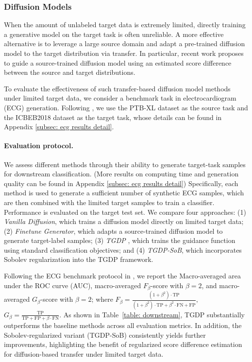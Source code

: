 \documentclass[11pt]{article}
\theoremstyle{plain}
\theoremstyle{definition}
\theoremstyle{remark}
\begin{document}
\subsubsection{ Diffusion Models}\label{subsec:diffusion}


When the amount of unlabeled target data is extremely limited, directly training a generative model on the target task is often unreliable.
A more effective alternative is to leverage a large source domain and adapt a pre-trained diffusion model to the target distribution via transfer.
In particular, recent work \cite{ouyang2024transfer} proposes to guide a source-trained diffusion model using an estimated score difference between the source and target distributions.


To evaluate the effectiveness of such transfer-based diffusion model methods under limited target data, we consider a benchmark task in electrocardiogram (ECG) generation. Following \cite{ouyang2024transfer}, we use the PTB-XL dataset \cite{wagner2020ptb} as the source task and the ICBEB2018 dataset \cite{liu2018open} as the target task, whose details can be found in Appendix \ref{subsec: ecg results detail}.

\paragraph{Evaluation protocol.} We assess different methods through their ability to generate target-task samples for downstream classification. (More results on computing time and generation quality can be found in Appendix \ref{subsec: ecg results detail}) Specifically, each method is used to generate a sufficient number of synthetic ECG samples, which are then combined with the limited target samples to train a classifier. Performance is evaluated on the target test set. We compare four approaches:
(1) \emph{Vanilla Diffusion}, which trains a diffusion model directly on limited target data;
(2) \emph{Finetune Generator}, which adapts a source-trained diffusion model to generate target-label samples;
(3) \emph{TGDP} \cite{ouyang2024transfer}, which trains the guidance function using standard classification objectives; and
(4) \emph{TGDP-SoB}, which incorporates Sobolev regularization into the TGDP framework.

Following the ECG benchmark protocol in \cite{strodthoff2020deep}, we report the Macro-averaged area under the ROC curve (AUC), macro-averaged $F_\beta$-score with $\beta=2$, and macro-averaged $G_\beta$-score with $\beta=2$; where $F_\beta = \frac{(1+\beta^2) \cdot \text{TP}}{(1+\beta^2) \cdot \text{TP} + \beta^2 \cdot \text{FN} + \text{FP}}$, $ G_\beta = \frac{\text{TP}}{\text{TP} + \text{FP} + \beta \cdot \text{FN}}$. As shown in Table~\ref{table: downstream}, TGDP substantially outperforms the baseline methods across all evaluation metrics. In addition, the Sobolev-regularized variant (TGDP-SoB) consistently yields further improvements, highlighting the benefit of regularized score difference estimation for diffusion-based transfer under limited target data.
\end{document}
